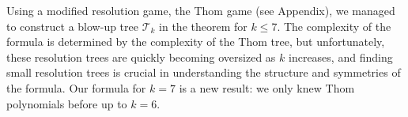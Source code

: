 \documentclass{article}
\theoremstyle{plain}
\theoremstyle{definition}
\theoremstyle{remark}
\newcommand{\CC}{{\mathbb{C}}}
\begin{document}
Using a modified resolution game, the Thom game (see Appendix), we managed to construct a blow-up tree $\mathcal{T}_k$ in the theorem for $k\le 7$. 
The complexity of the formula is determined by the complexity of the Thom tree, but unfortunately, these resolution trees are quickly becoming oversized as $k$ increases, and finding small resolution trees is crucial in understanding the structure and symmetries of the formula. Our formula for $k=7$ is a new result: we only knew Thom polynomials before  up to $k=6$. 



\end{document}
